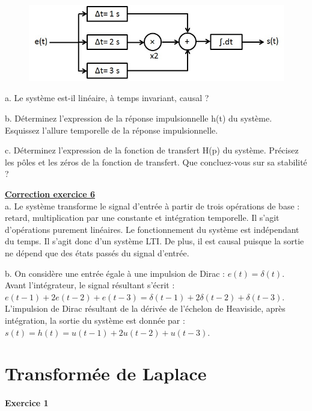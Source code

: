 \documentclass[11pt]{report}
\begin{document}
 	\begin{figure}[h!]
 		\centering
 		\includegraphics[scale=0.5]{images/Exo_2_6.jpg} 
 	\end{figure}
 
 	a. Le système est-il linéaire, à temps invariant, causal ?
 	
 	b. Déterminez l'expression de la réponse impulsionnelle h(t) du système. Esquissez l'allure temporelle de la réponse impulsionnelle. 
 	
 	c. Déterminez l'expression de la fonction de transfert H(p) du système. Précisez les pôles et les zéros de la fonction de transfert. Que concluez-vous sur sa stabilité ?
 
 	\vspace{1\baselineskip}
 	
 		\textbf{\underline{Correction exercice 6}}\\
 	a. Le système transforme le signal d'entrée à partir de trois opérations de base : retard, multiplication par une constante et intégration temporelle. Il s'agit d'opérations purement linéaires. Le fonctionnement du système est indépendant du temps. Il s'agit donc d'un système LTI. De plus, il est causal puisque la sortie ne dépend que des états passés du signal d'entrée.
 	
 	b. On considère une entrée égale à une impulsion de Dirac : $e(t) = \delta(t)$.	Avant l'intégrateur, le signal résultant s'écrit : $e(t-1)+2e(t-2)+e(t-3)=\delta(t-1)+2\delta(t-2)+\delta(t-3)$. L'impulsion de Dirac résultant de la dérivée de l'échelon de Heaviside, après intégration, la sortie du système est donnée par : $s(t) = h(t) = u(t-1)+2u(t-2)+u(t-3)$.
 	
	
	\newpage
	
	\chapter{Transformée de Laplace}
	
	
	\subsubsection{Exercice 1}
	
\end{document}
